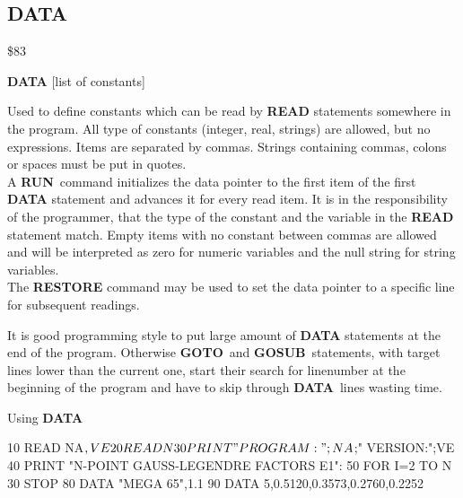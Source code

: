 \subsection{DATA}
\begin{description}[leftmargin=3cm,style=nextline]
\item [Token:] \$83
\item [Format:] {\bf DATA} [list of constants]
\item [Usage:] Used to define constants
               which can be read by {\bf READ} statements somewhere
               in the program. All type of constants (integer, real,
               strings) are allowed, but no expressions.
               Items are separated by commas.
               Strings containing commas, colons or spaces must be put
               in quotes. \\
               A {\bf RUN} command initializes the data pointer
               to the first item of the first {\bf DATA} statement
               and advances it for every read item. It is in the
               responsibility of the programmer, that the type of
               the constant and the variable in the {\bf READ}
               statement match. Empty items with no constant
               between commas are allowed and will be interpreted as
               zero for numeric variables and the null string for
               string variables. \\
               The {\bf RESTORE} command may be used to set the
               data pointer to a specific line for subsequent
               readings.

\item [Remarks:] It is good programming style to put large amount of
               {\bf DATA} statements at the end of the program.
               Otherwise {\bf GOTO} and {\bf GOSUB} statements, with
               target lines lower than the current one,
               start their search for linenumber at the beginning of
               the program and have to skip through {\bf DATA} lines
               wasting time.
\item [Example:] Using {\bf DATA}
\begin{screenoutput}
10 READ NA$, VE
20 READ N%
30 PRINT "PROGRAM:";NA$;"   VERSION:";VE
40 PRINT "N-POINT GAUSS-LEGENDRE FACTORS E1":
50 FOR I=2 TO N%
30 STOP
80 DATA "MEGA 65",1.1
90 DATA 5,0.5120,0.3573,0.2760,0.2252
\end{screenoutput}
\end{description}

